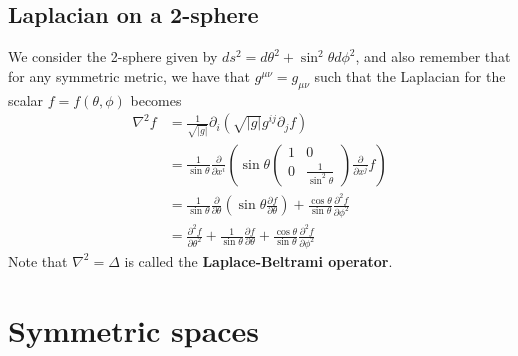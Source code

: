 \documentclass{article}
\begin{document}
		\subsection{Laplacian on a 2-sphere}
		We consider the 2-sphere given by $ds^2 = d\theta^2 + \sin^2 \theta d \phi^2$, and also remember that for any symmetric metric, we have that $g^{\mu\nu}=g_{\mu\nu}$ such that the Laplacian for the scalar $f=f(\theta, \phi)$ becomes
		\begin{align*}
			\nabla^2 f&= \frac{1}{\sqrt{|g|}} \partial_i \left( \sqrt{|g|} g^{ij} \partial_j f \right) \\ 
			&= \frac{1}{\sin \theta} \frac{\partial}{\partial x^i} \left( \sin\theta 
			\begin{pmatrix}
				1 & 0 \\
				0 & \frac{1}{\sin^2\theta}
			\end{pmatrix}  \frac{\partial}{\partial x^j} f\right) \\
			&= \frac{1}{\sin \theta} \frac{\partial}{\partial \theta} \left( \sin \theta \frac{\partial f}{\partial\theta} \right) + \frac{\cos\theta}{\sin \theta} \frac{\partial^2 f}{\partial \phi^2} \\
			&= \frac{\partial^2 f}{\partial \theta^2} + \frac{1}{\sin\theta} \frac{\partial f}{\partial \theta} + \frac{\cos\theta}{\sin \theta} \frac{\partial^2 f}{\partial \phi^2} 
		\end{align*}
		Note that $\nabla^2 = \Delta$ is called the \textbf{Laplace-Beltrami operator}.
	\pagebreak
	\section{Symmetric spaces}
\end{document}
